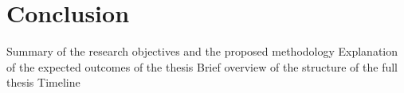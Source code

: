 \chapter{Conclusion}
Summary of the research objectives and the proposed methodology
Explanation of the expected outcomes of the thesis
Brief overview of the structure of the full thesis
Timeline
